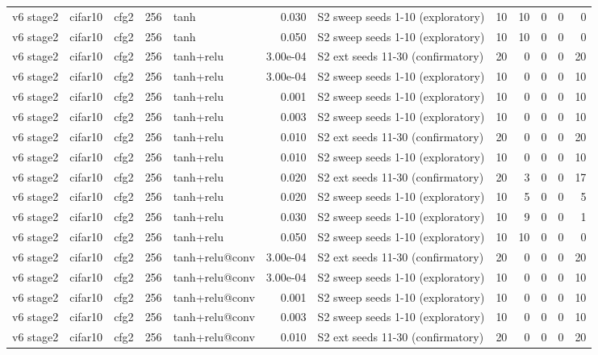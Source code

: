 \begin{table}[htbp]
{\begin{tabular}{@{}lllrlrlrrrrr@{}}
v6 stage2 & cifar10 & cfg2 & 256 & tanh & 0.030 & S2 sweep seeds 1-10 (exploratory) & 10 & 10 & 0 & 0 & 0 \\
v6 stage2 & cifar10 & cfg2 & 256 & tanh & 0.050 & S2 sweep seeds 1-10 (exploratory) & 10 & 10 & 0 & 0 & 0 \\
v6 stage2 & cifar10 & cfg2 & 256 & tanh+relu & 3.00e-04 & S2 ext seeds 11-30 (confirmatory) & 20 & 0 & 0 & 0 & 20 \\
v6 stage2 & cifar10 & cfg2 & 256 & tanh+relu & 3.00e-04 & S2 sweep seeds 1-10 (exploratory) & 10 & 0 & 0 & 0 & 10 \\
v6 stage2 & cifar10 & cfg2 & 256 & tanh+relu & 0.001 & S2 sweep seeds 1-10 (exploratory) & 10 & 0 & 0 & 0 & 10 \\
v6 stage2 & cifar10 & cfg2 & 256 & tanh+relu & 0.003 & S2 sweep seeds 1-10 (exploratory) & 10 & 0 & 0 & 0 & 10 \\
v6 stage2 & cifar10 & cfg2 & 256 & tanh+relu & 0.010 & S2 ext seeds 11-30 (confirmatory) & 20 & 0 & 0 & 0 & 20 \\
v6 stage2 & cifar10 & cfg2 & 256 & tanh+relu & 0.010 & S2 sweep seeds 1-10 (exploratory) & 10 & 0 & 0 & 0 & 10 \\
v6 stage2 & cifar10 & cfg2 & 256 & tanh+relu & 0.020 & S2 ext seeds 11-30 (confirmatory) & 20 & 3 & 0 & 0 & 17 \\
v6 stage2 & cifar10 & cfg2 & 256 & tanh+relu & 0.020 & S2 sweep seeds 1-10 (exploratory) & 10 & 5 & 0 & 0 & 5 \\
v6 stage2 & cifar10 & cfg2 & 256 & tanh+relu & 0.030 & S2 sweep seeds 1-10 (exploratory) & 10 & 9 & 0 & 0 & 1 \\
v6 stage2 & cifar10 & cfg2 & 256 & tanh+relu & 0.050 & S2 sweep seeds 1-10 (exploratory) & 10 & 10 & 0 & 0 & 0 \\
v6 stage2 & cifar10 & cfg2 & 256 & tanh+relu@conv & 3.00e-04 & S2 ext seeds 11-30 (confirmatory) & 20 & 0 & 0 & 0 & 20 \\
v6 stage2 & cifar10 & cfg2 & 256 & tanh+relu@conv & 3.00e-04 & S2 sweep seeds 1-10 (exploratory) & 10 & 0 & 0 & 0 & 10 \\
v6 stage2 & cifar10 & cfg2 & 256 & tanh+relu@conv & 0.001 & S2 sweep seeds 1-10 (exploratory) & 10 & 0 & 0 & 0 & 10 \\
v6 stage2 & cifar10 & cfg2 & 256 & tanh+relu@conv & 0.003 & S2 sweep seeds 1-10 (exploratory) & 10 & 0 & 0 & 0 & 10 \\
v6 stage2 & cifar10 & cfg2 & 256 & tanh+relu@conv & 0.010 & S2 ext seeds 11-30 (confirmatory) & 20 & 0 & 0 & 0 & 20 \\

\end{tabular}}
\end{table}
